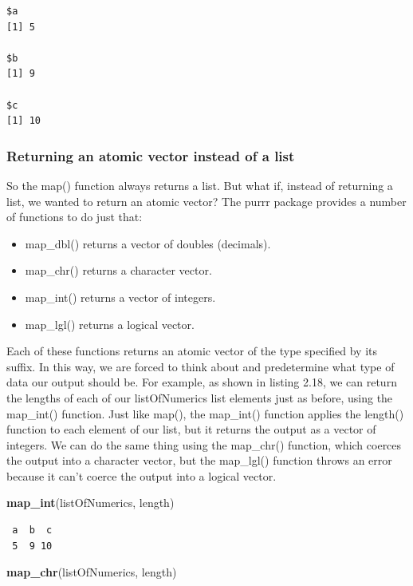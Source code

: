 \documentclass[
]{article}
\newenvironment{Shaded}{\begin{snugshade}}{\end{snugshade}}
\newcommand{\FunctionTok}[1]{\textcolor[rgb]{0.13,0.29,0.53}{\textbf{#1}}}
\newcommand{\NormalTok}[1]{#1}
\providecommand{\tightlist}{%
  \setlength{\itemsep}{0pt}\setlength{\parskip}{0pt}}
\begin{document}
\begin{verbatim}
$a
[1] 5

$b
[1] 9

$c
[1] 10
\end{verbatim}

\subsubsection{Returning an atomic vector instead of a
list}\label{returning-an-atomic-vector-instead-of-a-list}

So the map() function always returns a list. But what if, instead of
returning a list, we wanted to return an atomic vector? The purrr
package provides a number of functions to do just that:

\begin{itemize}
\tightlist
\item
  map\_dbl() returns a vector of doubles (decimals).
\item
  map\_chr() returns a character vector.
\item
  map\_int() returns a vector of integers.
\item
  map\_lgl() returns a logical vector.
\end{itemize}

Each of these functions returns an atomic vector of the type specified
by its suffix. In this way, we are forced to think about and
predetermine what type of data our output should be. For example, as
shown in listing 2.18, we can return the lengths of each of our
listOfNumerics list elements just as before, using the map\_int()
function. Just like map(), the map\_int() function applies the length()
function to each element of our list, but it returns the output as a
vector of integers. We can do the same thing using the map\_chr()
function, which coerces the output into a character vector, but the
map\_lgl() function throws an error because it can't coerce the output
into a logical vector.

\begin{Shaded}
\begin{Highlighting}[]
\FunctionTok{map\_int}\NormalTok{(listOfNumerics, length)}
\end{Highlighting}
\end{Shaded}

\begin{verbatim}
 a  b  c 
 5  9 10 
\end{verbatim}

\begin{Shaded}
\begin{Highlighting}[]
\FunctionTok{map\_chr}\NormalTok{(listOfNumerics, length)}
\end{Highlighting}
\end{Shaded}
\end{document}
